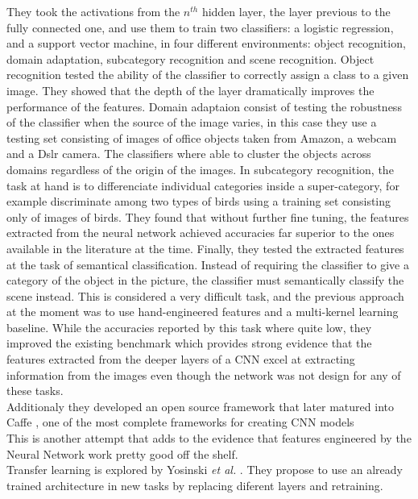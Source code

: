 They took the activations from the $n^{th}$ hidden layer, the layer previous to the fully connected one, and use them to train two classifiers: a logistic regression, and a support vector machine, in four different environments: object recognition, domain adaptation, subcategory recognition and scene recognition. Object recognition tested the ability of the classifier to correctly assign a class to a given image. They showed that the depth of the layer dramatically improves the performance of the features. Domain adaptaion consist of testing the robustness of the classifier when the source of the image varies, in this case they use a testing set consisting of images of office objects taken from Amazon, a webcam and a Dslr camera. The classifiers where able to cluster the objects across domains regardless of the origin of the images. In subcategory recognition, the task at hand is to differenciate individual categories inside a super-category, for example discriminate among two types of birds using a training set consisting only of images of birds. They found that without further fine tuning, the features extracted from the neural network achieved accuracies far superior to the ones available in the literature at the time. Finally, they tested the extracted features at the task of semantical classification. Instead of requiring the classifier to give a category of the object in the picture, the classifier must semantically classify the scene instead. This is considered a very difficult task, and the previous approach at the moment was to use hand-engineered features and a multi-kernel learning baseline. While the accuracies reported by this task where quite low, they improved the existing benchmark which provides strong evidence that the features extracted from the deeper layers of a CNN excel at extracting information from the images even though the network was not design for any of these tasks.\\


Additionaly they developed an open source framework that later matured into Caffe \cite{jia2014caffe}, one of the most complete frameworks for creating CNN models\\

This is another attempt that adds to the evidence that features engineered by the Neural Network work pretty good off the shelf. \cite{DBLP:journals/corr/RazavianASC14}\\

Transfer learning is explored by Yosinski \textit{et al.} \cite{DBLP:journals/corr/YosinskiCBL14}. They propose to use an already trained architecture in new tasks by replacing diferent layers and retraining.\\


